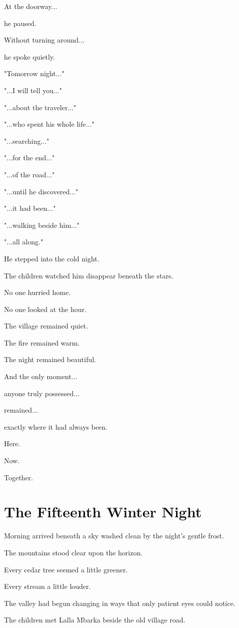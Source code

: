\documentclass[12pt,openany]{book}
\begin{document}
At the doorway...

he paused.

Without turning around...

he spoke quietly.

"Tomorrow night..."

"...I will tell you..."

"...about the traveler..."

"...who spent his whole life..."

"...searching..."

"...for the end..."

"...of the road..."

"...until he discovered..."

"...it had been..."

"...walking beside him..."

"...all along."

He stepped into the cold night.

The children watched him disappear beneath the stars.

No one hurried home.

No one looked at the hour.

The village remained quiet.

The fire remained warm.

The night remained beautiful.

And the only moment...

anyone truly possessed...

remained...

exactly where it had always been.

Here.

Now.

Together.
\chapter{The Fifteenth Winter Night}

Morning arrived beneath a sky washed clean by the night's gentle frost.

The mountains stood clear upon the horizon.

Every cedar tree seemed a little greener.

Every stream a little louder.

The valley had begun changing in ways that only patient eyes could notice.

The children met Lalla Mbarka beside the old village road.
\end{document}
